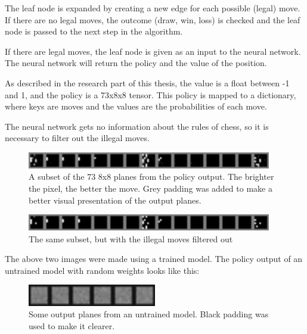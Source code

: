 \documentclass{article}
\begin{document}
The leaf node is expanded by creating a new edge for each possible (legal) move.
If there are no legal moves, the outcome (draw, win, loss) is checked and the leaf node
is passed to the next step in the algorithm.

If there are legal moves, the leaf node is given as an input to the neural network.
The neural network will return the policy and the value of the position.

As described in the research part of this thesis, the value is a float between -1 and 1, and the 
policy is a 73x8x8 tensor. This policy is mapped to a dictionary, where keys are moves and 
the values are the probabilities of each move. 

The neural network gets no information about the rules of chess, so it is necessary to filter
out the illegal moves. 

\begin{figure}[H]
    \centering
    \includegraphics[width=0.95\textwidth]{img/output-planes/unfiltered.png}
    \caption{A subset of the 73 8x8 planes from the policy output. The brighter the pixel, the better the move. Grey padding was added to make a better visual presentation of the output planes.}
\end{figure}

\begin{figure}[H]
    \centering
    \includegraphics[width=0.95\textwidth]{img/output-planes/filtered.png}
    \caption{The same subset, but with the illegal moves filtered out}
\end{figure}

The above two images were made using a trained model. The policy output of an untrained model with random weights 
looks like this:

\begin{figure}[H]
    \centering
    \includegraphics[width=0.5\textwidth]{img/output-planes/random-model-unfiltered.png}
    \caption{Some output planes from an untrained model. Black padding was used to make it clearer.}
\end{figure}
\end{document}
